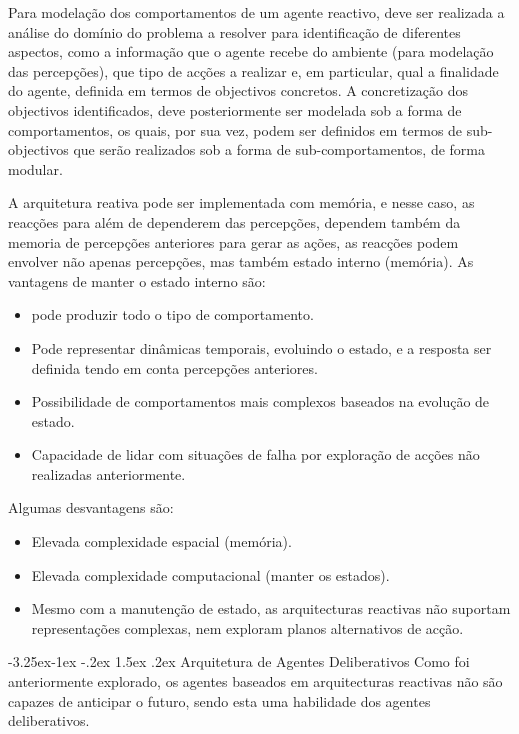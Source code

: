 \documentclass[a4paper,12pt]{article}
\makeatletter
\renewcommand\paragraph{\@startsection{paragraph}{4}{\z@}%
                {-3.25ex\@plus -1ex \@minus -.2ex}%
                {1.5ex \@plus .2ex}%
                {\normalfont\normalsize\bfseries}}
\makeatother
\begin{document}
Para modelação dos comportamentos de um agente reactivo, deve ser realizada a análise do domínio do problema a resolver para identificação de diferentes aspectos, como a informação que o agente recebe do ambiente (para modelação das percepções), que tipo de acções a realizar e, em particular, qual a finalidade do agente, definida em termos de objectivos concretos.
A concretização dos objectivos identificados, deve posteriormente ser modelada sob a forma de comportamentos, os quais, por sua vez, podem ser definidos em termos de sub-objectivos que serão realizados sob a forma de sub-comportamentos, de forma modular.

A arquitetura reativa pode ser implementada com memória, e nesse caso, as reacções para além de dependerem das percepções, dependem também da memoria de percepções anteriores para gerar as ações, as reacções podem envolver não apenas percepções, mas também estado interno (memória). As vantagens de manter o estado interno são:
\begin{itemize}
	\item pode produzir todo o tipo de comportamento.
	\item Pode representar dinâmicas temporais, evoluindo o estado, e a resposta ser definida tendo em conta percepções anteriores.
	\item Possibilidade de comportamentos mais complexos baseados na evolução de estado.
	\item Capacidade de lidar com situações de falha por exploração de acções não realizadas anteriormente.
\end{itemize}

Algumas desvantagens são:
\begin{itemize}
	\item Elevada complexidade espacial (memória).
	\item Elevada complexidade computacional (manter os estados).
	\item Mesmo com a manutenção de estado, as arquitecturas reactivas não suportam representações complexas, nem exploram planos alternativos de acção.
\end{itemize}

\paragraph{Arquitetura de Agentes Deliberativos}
Como foi anteriormente explorado, os agentes baseados em arquitecturas reactivas não são capazes de anticipar o futuro, sendo esta uma habilidade dos agentes deliberativos.
\end{document}
